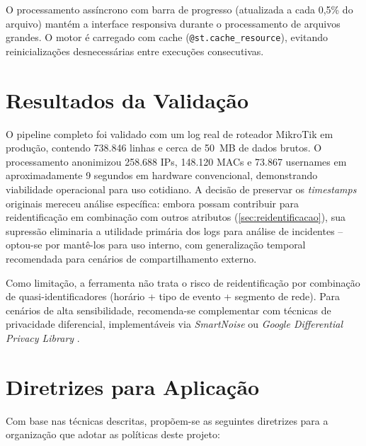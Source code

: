O processamento assíncrono com barra de progresso (atualizada a cada 0,5\% do arquivo) mantém a interface responsiva durante o processamento de arquivos grandes. O motor é carregado com cache (\texttt{@st.cache\_resource}), evitando reinicializações desnecessárias entre execuções consecutivas.

\section{Resultados da Validação}
\label{sec:presidio-pipeline}

O pipeline completo foi validado com um log real de roteador MikroTik em produção, contendo 738.846 linhas e cerca de 50~MB de dados brutos. O processamento anonimizou 258.688 IPs, 148.120 MACs e 73.867 usernames em aproximadamente 9 segundos em hardware convencional, demonstrando viabilidade operacional para uso cotidiano. A decisão de preservar os \textit{timestamps} originais mereceu análise específica: embora possam contribuir para reidentificação em combinação com outros atributos (\autoref{sec:reidentificacao}), sua supressão eliminaria a utilidade primária dos logs para análise de incidentes -- optou-se por mantê-los para uso interno, com generalização temporal recomendada para cenários de compartilhamento externo.

Como limitação, a ferramenta não trata o risco de reidentificação por combinação de quasi-identificadores (horário + tipo de evento + segmento de rede). Para cenários de alta sensibilidade, recomenda-se complementar com técnicas de privacidade diferencial, implementáveis via \textit{SmartNoise} ou \textit{Google Differential Privacy Library} \cite{dwork2014differential}.

\section{Diretrizes para Aplicação}
\label{sec:diretrizes-aplicacao}

Com base nas técnicas descritas, propõem-se as seguintes diretrizes para a organização que adotar as políticas deste projeto:


